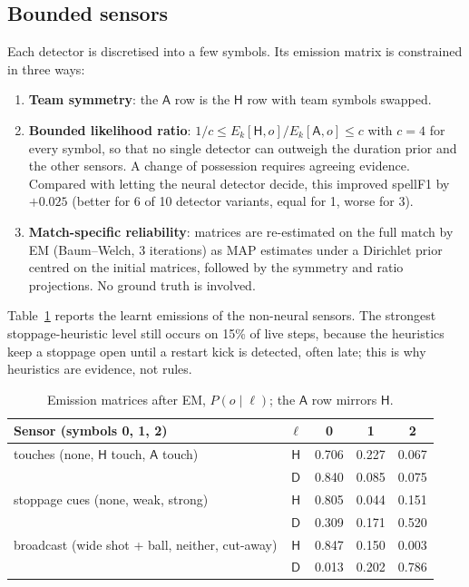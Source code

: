 \documentclass[10pt,a4paper]{article}
\newcommand{\lH}{\mathsf{H}}
\newcommand{\lA}{\mathsf{A}}
\newcommand{\lD}{\mathsf{D}}
\begin{document}
\subsection{Bounded sensors}\label{sec:obs}
Each detector is discretised into a few symbols. Its emission matrix is constrained in three ways:
\begin{enumerate}
\item \textbf{Team symmetry}: the $\lA$ row is the $\lH$ row with team symbols swapped.
\item \textbf{Bounded likelihood ratio}: $1/c\le E_k[\lH,o]/E_k[\lA,o]\le c$ with $c=4$ for every
  symbol, so that no single detector can outweigh the duration prior and the other sensors. A change
  of possession requires agreeing evidence. Compared with letting the neural detector decide, this
  improved spellF1 by $+0.025$ (better for 6 of 10 detector variants, equal for 1, worse for 3).
\item \textbf{Match-specific reliability}: matrices are re-estimated on the full match by EM
  (Baum--Welch, 3 iterations) as MAP estimates under a Dirichlet prior centred on the initial
  matrices, followed by the symmetry and ratio projections. No ground truth is involved.
\end{enumerate}
Table~\ref{tab:em} reports the learnt emissions of the non-neural sensors. The strongest
stoppage-heuristic level still occurs on 15\% of live steps, because the heuristics keep a stoppage
open until a restart kick is detected, often late; this is why heuristics are evidence, not rules.

\begin{table}[t]
\centering\small
\caption{Emission matrices after EM, $P(o\mid\ell)$; the $\lA$ row mirrors $\lH$.}
\label{tab:em}
\begin{tabular}{@{}l c ccc@{}}
\toprule
Sensor (symbols 0, 1, 2) & $\ell$ & 0 & 1 & 2\\
\midrule
touches (none, $\lH$ touch, $\lA$ touch) & $\lH$ & 0.706 & 0.227 & 0.067 \\
 & $\lD$ & 0.840 & 0.085 & 0.075 \\
\addlinespace
stoppage cues (none, weak, strong) & $\lH$ & 0.805 & 0.044 & 0.151 \\
 & $\lD$ & 0.309 & 0.171 & 0.520 \\
\addlinespace
broadcast (wide shot + ball, neither, cut-away) & $\lH$ & 0.847 & 0.150 & 0.003 \\
 & $\lD$ & 0.013 & 0.202 & 0.786 \\
\bottomrule
\end{tabular}
\end{table}
\end{document}
